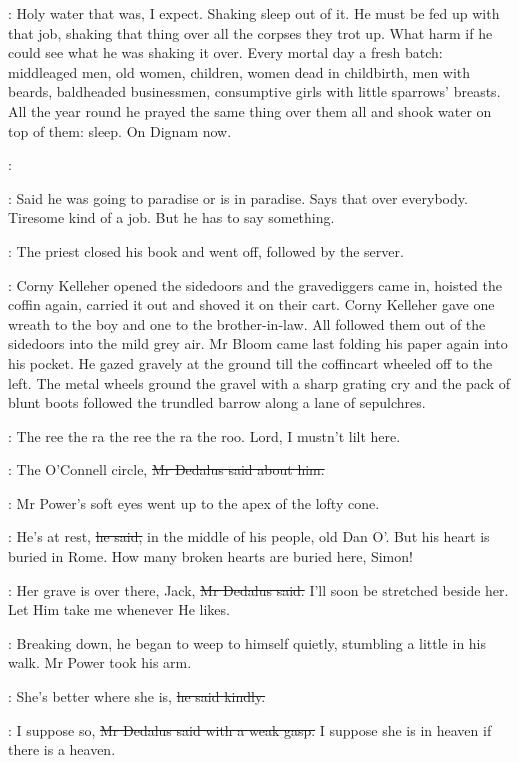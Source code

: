 \BloomInt:
Holy water that was, I expect.
Shaking sleep out of it.
He must be fed up with that job,
shaking that thing over all the corpses they trot up.
What harm if he could see what he was shaking it over.
Every mortal day a fresh batch:
middleaged men, old women, children,
women dead in childbirth,
men with beards, baldheaded businessmen,
consumptive girls with little sparrows' breasts.
All the year round
he prayed the same thing over them all and shook water on top of them:
sleep.
On Dignam now.

\coffey:

\BloomInt:
Said he was going to paradise or is in paradise.
Says that over everybody.
Tiresome kind of a job.
But he has to say something.

:
The priest closed his book and went off, followed by the server.

:
Corny Kelleher opened the sidedoors and the gravediggers came in,
hoisted the coffin again, carried it out and shoved it on their cart.
Corny Kelleher gave one wreath to the boy and one to the brother-in-law.
All followed them out of the sidedoors into the mild grey air.
Mr Bloom came last
folding his paper again into his pocket.
He gazed gravely at the ground
till the coffincart wheeled off to the left.
The metal wheels ground the gravel
with a sharp grating cry
and the pack of blunt boots followed the trundled barrow
along a lane of sepulchres.

\BloomInt:
The ree the ra the ree the ra the roo.
Lord, I mustn't lilt here.

\simon:
The O'Connell circle,
\sout{Mr Dedalus said about him.}

:
Mr Power's soft eyes went up to the apex of the lofty cone.

\power:
He's at rest,
\sout{he said,}
in the middle of his people, old Dan O'.
But his heart is buried in Rome.
How many broken hearts are buried here, Simon!

\simon:
Her grave is over there, Jack,
\sout{Mr Dedalus said.}
I'll soon be stretched beside her.
Let Him take me whenever He likes.

:
Breaking down, he began to weep to himself quietly,
stumbling a little in his walk.
Mr Power took his arm.

\power:
She's better where she is,
\sout{he said kindly.}

\simon:
I suppose so,
\sout{Mr Dedalus said with a weak gasp.}
I suppose she is in heaven if there is a heaven.

